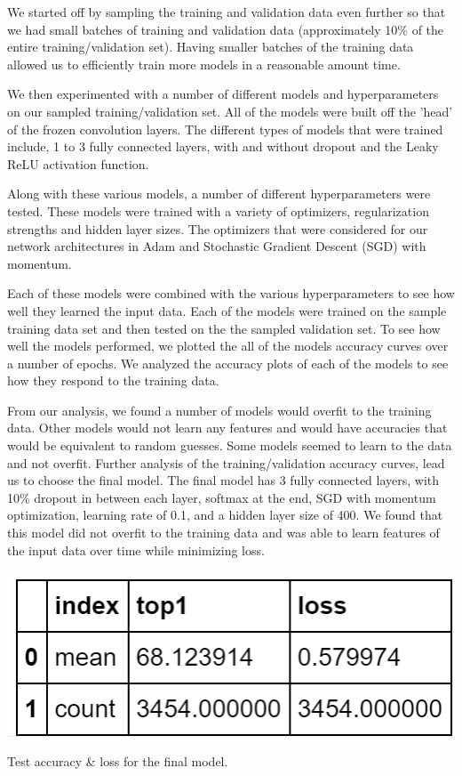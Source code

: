 \documentclass[10pt,twocolumn,letterpaper]{article}
\begin{document}
We started off by sampling the training and validation data even further so that we had small batches of training and validation data (approximately 10\% of the entire training/validation set). Having smaller batches of the training data allowed us to efficiently train more models in a reasonable amount time. 

We then experimented with a number of different models and hyperparameters on our sampled training/validation set. All of the models were built off the 'head' of the frozen convolution layers. The different types of models that were trained include, 1 to 3 fully connected layers, with and without dropout and the Leaky ReLU activation function.

Along with these various models, a number of different hyperparameters were tested. These models were trained with a variety of optimizers, regularization strengths and hidden layer sizes. The optimizers that were considered for our network architectures in Adam and Stochastic Gradient Descent (SGD) with momentum. 

Each of these models were combined with the various hyperparameters to see how well they learned the input data. Each of the models were trained on the sample training data set and then tested on the the sampled validation set. To see how well the models performed, we plotted the all of the models accuracy curves over a number of epochs. We analyzed the accuracy plots of each of the models to see how they respond to the training data. 

From our analysis, we found a number of models would overfit to the training data. Other models would not learn any features and would have accuracies that would be equivalent to random guesses. Some models seemed to learn to the data and not overfit. Further analysis of the training/validation accuracy curves, lead us to choose the final model. The final model has 3 fully connected layers, with 10\% dropout in between each layer, softmax at the end, SGD with momentum optimization, learning rate of 0.1, and a hidden layer size of 400. We found that this model did not overfit to the training data and was able to learn features of the input data over time while minimizing loss. 

\begin{table}[t]
\begin{center}
	\includegraphics[width=0.7\linewidth]{final_acc_table.png}
\end{center}
   \caption{Test accuracy \& loss for the final model.}
\label{fig:long}
\label{fig:onecol}
\end{table}
\end{document}
